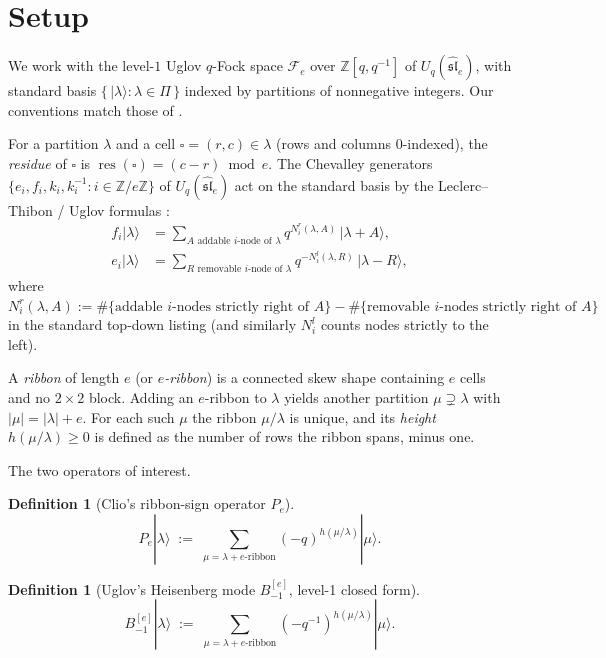\documentclass[11pt]{article}
\theoremstyle{definition}
\newtheorem{definition}[theorem]{Definition}
\newcommand{\Fock}{\mathcal{F}}
\newcommand{\Uq}{U_q(\widehat{\mathfrak{sl}}_e)}
\newcommand{\Bmi}{B_{-1}^{[e]}}
\begin{document}
\section{Setup}
\label{sec:setup}

We work with the level-$1$ Uglov $q$-Fock space $\Fock_e$ over $\mathbb Z[q, q^{-1}]$
of $\Uq$, with standard basis $\{\,|\lambda\rangle : \lambda \in \Pi\,\}$
indexed by partitions of nonnegative integers. Our conventions match those of
\cite{LT96, Ugl00, Iij12, Clio-commutation-defect-2026-08-12}.

For a partition $\lambda$ and a cell $\square = (r, c) \in \lambda$ (rows and
columns $0$-indexed), the \emph{residue} of $\square$ is $\operatorname{res}(\square) = (c - r) \bmod e$.
The Chevalley generators $\{e_i, f_i, k_i, k_i^{-1} : i \in \mathbb Z/e\mathbb Z\}$
of $\Uq$ act on the standard basis by the Leclerc--Thibon / Uglov formulas
\cite{LT96}:
\begin{align}
    f_i |\lambda\rangle &= \sum_{A \text{ addable $i$-node of $\lambda$}} q^{N_i^r(\lambda, A)} \, |\lambda + A\rangle, \\
    e_i |\lambda\rangle &= \sum_{R \text{ removable $i$-node of $\lambda$}} q^{-N_i^l(\lambda, R)} \, |\lambda - R\rangle,
\end{align}
where $N_i^r(\lambda, A) := \#\{\text{addable $i$-nodes strictly right of $A$}\} - \#\{\text{removable $i$-nodes strictly right of $A$}\}$
in the standard top-down listing (and similarly $N_i^l$ counts nodes strictly to the left).

A \emph{ribbon} of length $e$ (or \emph{$e$-ribbon}) is a connected skew shape
containing $e$ cells and no $2 \times 2$ block. Adding an $e$-ribbon to $\lambda$
yields another partition $\mu \supsetneq \lambda$ with $|\mu| = |\lambda| + e$.
For each such $\mu$ the ribbon $\mu/\lambda$ is unique, and its \emph{height}
$h(\mu/\lambda) \ge 0$ is defined as the number of rows the ribbon spans, minus one.

The two operators of interest.

\begin{definition}[Clio's ribbon-sign operator $P_e$]
\label{def:Pe}
\[
    P_e |\lambda\rangle \;:=\; \sum_{\mu = \lambda + e\text{-ribbon}} (-q)^{h(\mu/\lambda)} |\mu\rangle.
\]
\end{definition}

\begin{definition}[Uglov's Heisenberg mode $\Bmi$, level-1 closed form]
\label{def:Bm1}
\[
    \Bmi |\lambda\rangle \;:=\; \sum_{\mu = \lambda + e\text{-ribbon}} (-q^{-1})^{h(\mu/\lambda)} |\mu\rangle.
\]
\end{definition}
\end{document}
